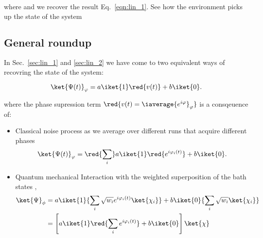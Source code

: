   \noindent                                                      where
     and   we  recover  the
   result Eq.~\eqref{eqn:lin_1}.  See how  the environment picks up the
   state of the system

 \subsection{General roundup}
 In  Sec.~\ref{sec:lin_1}  and  \ref{sec:lin_2}  we have  come  to  two
 equivalent ways of recovring the state of the system:

  \begin{equation}\label{key}
    \ket{\Psi(t)}_\varphi = a\iket{1}\red{v(t)} + b\iket{0}.
  \end{equation}

  \noindent       where      the       phase      supression       term
  $ \red{v(t) = \iaverage{e^{i\varphi}}_\varphi} $ is a consqeuence of:

  \begin{itemize}
  \item Classical noise process as  we average over different runs that
    acquire different phases
    \begin{equation}\label{key}
      \ket{\Psi(t)}_\varphi = \red{\sum_i} a\iket{1}\red{e^{i\varphi_i(t)}} + b\iket{0}.
    \end{equation}
  \item Quantum mechanical Interaction  with the weighted superposition
    of the bath states ,
    \begin{equation}\label{key}
      \begin{aligned}
        \ket{\Psi}_\phi & =  a\iket{1}{\sum_i\sqrt{w_i}e^{i\varphi_i(t)}\ket{\chi_i}} + b\iket{0}{\sum_i\sqrt{w_i}\ket{\chi_i}}\\
        &     =      \left[a\iket{1}\red{\sum_ie^{i\varphi_i(t)}}     +
          b\iket{0}\right]\ket{\chi}
      \end{aligned}
    \end{equation}
  \end{itemize}

